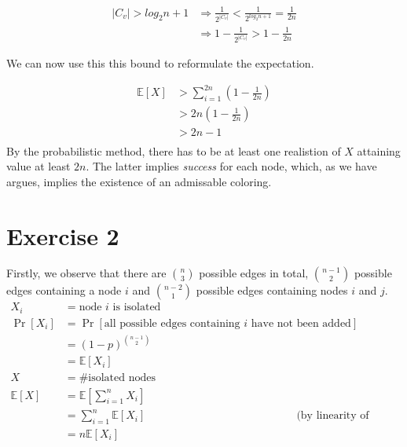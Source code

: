 \documentclass[a4paper,german]{article}
\begin{document}
\begin{align*}
|C_v| > log_2n + 1 &\Rightarrow \frac{1}{{2}^{|C_v|}} < \frac{1}{{2}^{log_2n + 1}} = \frac{1}{2n}\\
&\Rightarrow 1 - \frac{1}{{2}^{|C_v|}} > 1 - \frac{1}{2n} 
\end{align*}

We can now use this this bound to reformulate the expectation.

\begin{align*} \mathbb{E}[X] &> \sum_{i=1}^{2n}  (1 - \frac{1}{2n})  \\
&> 2n(1 - \frac{1}{2n} ) \\
&> 2n - 1 \\
\end{align*}
By the probabilistic method, there has to be at least one realistion of \(X\) attaining value at least \(2n\).  The latter implies \emph{success} for each node, which, as we have argues, implies the existence of an admissable coloring.

\section*{Exercise 2}

Firstly, we observe that there are \( {n} \choose {3} \) possible edges in total, \( {n-1} \choose {2} \)  possible edges containing a node \(i\) and \( {n-2} \choose {1} \)  possible edges containing nodes \(i\) and \(j\). 
\begin{align*}
X_i &= \text{node } i \text{ is isolated} \\
\Pr[X_i] &= \Pr[\text{all possible edges containing } i \text{ have not been added}] \\ 
&= (1-p)^ {{n-1} \choose {2}} \\
&= \mathbb{E} [X_i] \\
X &= \# \text{isolated nodes} \\
\mathbb{E}[X] &= \mathbb{E}[\sum_{i=1}^n X_i] \\
&= \sum_{i=1}^n  \mathbb{E}[X_i]  & \text{(by linearity of expectation)} \\
&= n \mathbb{E}[X_i]
\end{align*}
\end{document}

